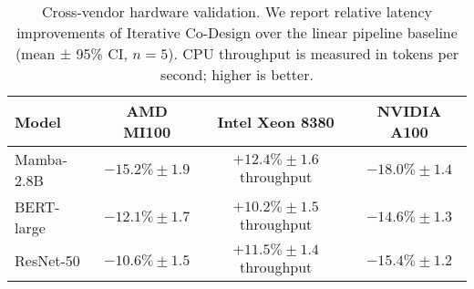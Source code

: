 \begin{table}[hbt!]
    \centering
    \caption{Cross-vendor hardware validation. We report relative latency improvements of Iterative Co-Design over the linear pipeline baseline (mean ± 95\% CI, $n=5$). CPU throughput is measured in tokens per second; higher is better.}
    \label{tab:cross_vendor}
    \begin{tabular}{l c c c}
        \toprule
        \textbf{Model} & \textbf{AMD MI100} & \textbf{Intel Xeon 8380} & \textbf{NVIDIA A100} \\
        \midrule
        Mamba-2.8B & $-15.2\% \pm 1.9$ & $+12.4\% \pm 1.6$ throughput & $-18.0\% \pm 1.4$ \\
        BERT-large & $-12.1\% \pm 1.7$ & $+10.2\% \pm 1.5$ throughput & $-14.6\% \pm 1.3$ \\
        ResNet-50 & $-10.6\% \pm 1.5$ & $+11.5\% \pm 1.4$ throughput & $-15.4\% \pm 1.2$ \\
        \bottomrule
    \end{tabular}
\end{table}
